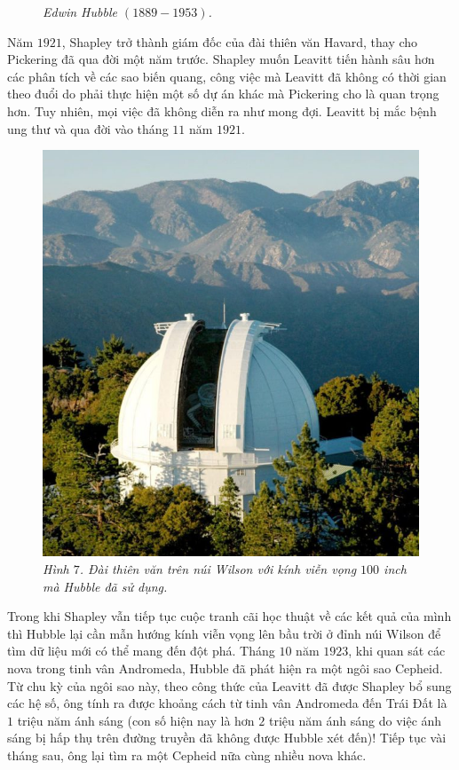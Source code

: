 \begin{multicols}{2}
\begin{figure}[H]
		\caption{\small\textit{\color{timhieukhoahoc}Edwin Hubble $(1889 - 1953)$.}}
		\vspace*{-10pt}
	\end{figure}
	Năm $1921$, Shapley trở thành giám đốc của đài thiên văn Havard, thay cho Pickering đã qua đời một năm trước. Shapley muốn Leavitt tiến hành sâu hơn các phân tích về các sao biến quang, công việc mà Leavitt đã không có thời gian theo đuổi do phải thực hiện một số dự án khác mà Pickering cho là quan trọng hơn. Tuy nhiên, mọi việc đã không diễn ra như mong đợi. Leavitt bị mắc bệnh ung thư và qua đời vào tháng $11$ năm $1921$.
	\begin{figure}[H]
		\vspace*{-5pt}
		\centering
		\captionsetup{labelformat= empty, justification=centering}
		\includegraphics[width= 1\linewidth]{10}
		\caption{\small\textit{\color{timhieukhoahoc}Hình $7$. Đài thiên văn trên núi Wilson với kính viễn vọng $100$ inch mà Hubble đã sử dụng.}}
		\vspace*{-10pt}
	\end{figure}
	Trong khi Shapley vẫn tiếp tục cuộc tranh cãi học thuật về các kết quả của mình thì Hubble lại cần mẫn hướng kính viễn vọng lên bầu trời ở đỉnh núi Wilson để tìm dữ liệu mới có thể mang đến đột phá. Tháng $10$ năm $1923$, khi quan sát các nova trong tinh vân Andromeda, Hubble đã phát hiện ra một ngôi sao Cepheid. Từ chu kỳ của ngôi sao này, theo công thức của Leavitt đã được Shapley bổ sung các hệ số, ông tính ra được khoảng cách từ tinh vân Andromeda đến Trái Đất là $1$ triệu năm ánh sáng (con số hiện nay là hơn $2$ triệu năm ánh sáng do việc ánh sáng bị hấp thụ trên đường truyền đã không được Hubble xét đến)!  Tiếp tục vài tháng sau, ông lại tìm ra một Cepheid nữa cùng nhiều nova khác.

\end{multicols}
